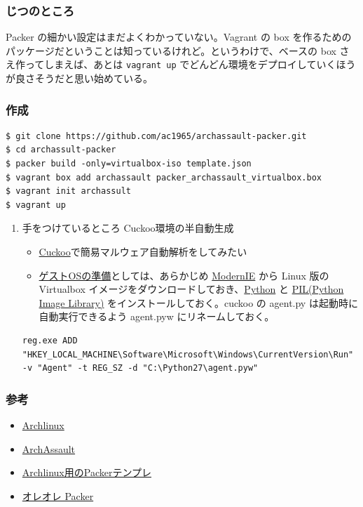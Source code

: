 \documentclass[11pt]{article}
\begin{document}
\subsubsection{じつのところ}
\label{sec:org4080e55}
Packer の細かい設定はまだよくわかっていない。Vagrant の box を作るためのパッケージだということは知っているけれど。というわけで、ベースの box さえ作ってしまえば、あとは \texttt{vagrant up} でどんどん環境をデプロイしていくほうが良さそうだと思い始めている。
\subsubsection{作成}
\label{sec:org91bba29}
\begin{verbatim}
$ git clone https://github.com/ac1965/archassault-packer.git
$ cd archassult-packer
$ packer build -only=virtualbox-iso template.json
$ vagrant box add archassault packer_archassault_virtualbox.box
$ vagrant init archassult
$ vagrant up
\end{verbatim}
\begin{enumerate}
\item 手をつけているところ
\label{sec:org9b6f5a6}
Cuckoo環境の半自動生成
\begin{itemize}
\item \href{http://www.cuckoosandbox.org}{Cuckoo}で簡易マルウェア自動解析をしてみたい
\item \href{http://cuckoo.readthedocs.org/en/latest/installation/guest/}{ゲストOSの準備}としては、あらかじめ \href{https://www.modern.ie/ja-jp}{ModernIE} から Linux 版の Virtualbox イメージをダウンロードしておき、\href{https://www.python.org/getit/}{Python} と \href{http://www.pythonware.com/products/pil/}{PIL(Python Image Library)} をインストールしておく。cuckoo の agent.py は起動時に自動実行できるよう agent.pyw にリネームしておく。
\end{itemize}

\begin{verbatim}
reg.exe ADD "HKEY_LOCAL_MACHINE\Software\Microsoft\Windows\CurrentVersion\Run" -v "Agent" -t REG_SZ -d "C:\Python27\agent.pyw"
\end{verbatim}
\end{enumerate}
\subsubsection{参考}
\label{sec:org0f5551b}
\begin{itemize}
\item \href{https://www.archlinux.org}{Archlinux}
\item \href{https://www.archassault.org}{ArchAssault}
\item \href{https://github.com/elasticdog/packer-arch}{Archlinux用のPackerテンプレ}
\item \href{https://github.com/ac1965/archassault-packer}{オレオレ Packer}
\end{itemize}
\end{document}
